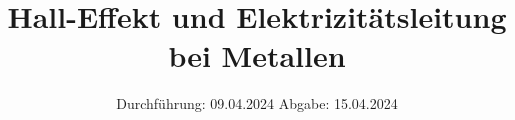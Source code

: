 

\subject{v511}
\title{Hall-Effekt und Elektrizitätsleitung bei Metallen}
\date{%
  Durchführung: 09.04.2024
  \hspace{3em}
  Abgabe: 15.04.2024
}



\maketitle
\thispagestyle{empty}
\tableofcontents
\newpage






\printbibliography{}

